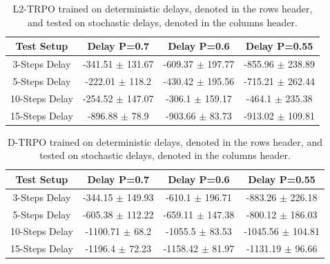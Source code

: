                 \begin{table}[!b]
                    \centering
                    \begin{tabular}{@{}cccc@{}}
                    \toprule
                    \multicolumn{1}{c}{Test Setup} & Delay P=0.7           & Delay P=0.6          & Delay P=0.55         \\ \midrule
                    3-Steps Delay                  & -341.51 $\pm$ 131.67  & -609.37 $\pm$ 197.77 & -855.96 $\pm$ 238.89 \\
                    5-Steps Delay                  & -222.01 $\pm$ 118.2   & -430.42 $\pm$ 195.56 & -715.21 $\pm$ 262.44 \\
                    10-Steps Delay                 & -254.52 $\pm$ 147.07  & -306.1  $\pm$ 159.17 & -464.1  $\pm$ 235.38 \\
                    15-Steps Delay                 & -896.88 $\pm$ 78.9    & -903.66 $\pm$ 83.73  & -913.02 $\pm$ 109.81 \\ \bottomrule
                    \end{tabular}
                    \centering
                    \caption{L2-TRPO trained on deterministic delays, denoted in the rows header, and tested on stochastic delays, denoted in the columns header.}
                    \label{tab:l2trpo_det_stoch}
                \end{table}
                
                \begin{table}[!b]
                    \centering
                    \begin{tabular}{@{}cccc@{}}
                    \toprule
                    \multicolumn{1}{c}{Test Setup} & Delay P=0.7           & Delay P=0.6            & Delay P=0.55          \\ \midrule
                    3-Steps Delay                  & -344.15 $\pm$ 149.93  & -610.1 $\pm$ 196.71    & -883.26 $\pm$ 226.18  \\
                    5-Steps Delay                  & -605.38 $\pm$ 112.22  & -659.11 $\pm$ 147.38   & -800.12 $\pm$ 186.03  \\
                    10-Steps Delay                 & -1100.71 $\pm$ 68.2   & -1055.5 $\pm$ 83.53    & -1045.56 $\pm$ 104.81 \\
                    15-Steps Delay                 & -1196.4 $\pm$ 72.23   & -1158.42 $\pm$ 81.97   & -1131.19 $\pm$ 96.66  \\ \bottomrule
                    \end{tabular}
                    \centering
                    \caption{D-TRPO trained on deterministic delays, denoted in the rows header, and tested on stochastic delays, denoted in the columns header.}
                    \label{tab:dtrpo_det_stoch}
                \end{table}
                

